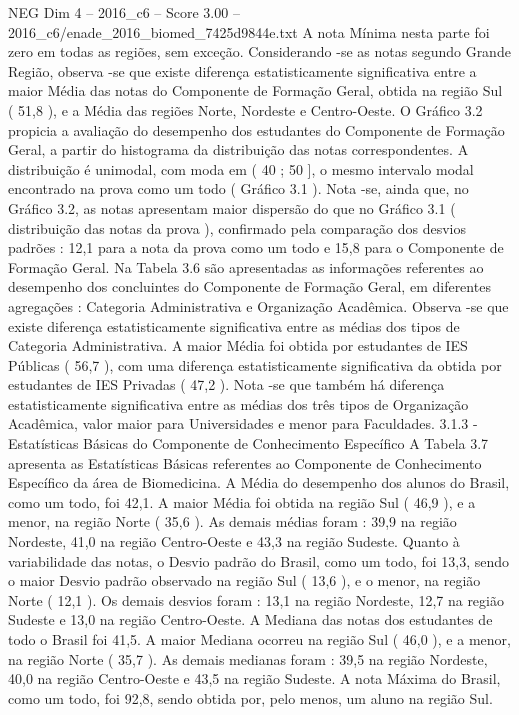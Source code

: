 \begin{textsample}{NEG Dim 4 – 2016\_c6 – Score 3.00 – 2016\_c6/enade\_2016\_biomed\_7425d9844e.txt}
A nota Mínima nesta parte foi zero em todas as regiões, sem exceção.
Considerando -se as notas segundo Grande Região, observa -se que existe diferença estatisticamente significativa entre a maior Média das notas do Componente de Formação Geral, obtida na região Sul ( 51,8 ), e a Média das regiões Norte, Nordeste e Centro-Oeste.
O Gráfico 3.2 propicia a avaliação do desempenho dos estudantes do Componente de Formação Geral, a partir do histograma da distribuição das notas correspondentes.
A distribuição é unimodal, com moda em ( 40 ; 50 ], o mesmo intervalo modal encontrado na prova como um todo ( Gráfico 3.1 ).
Nota -se, ainda que, no Gráfico 3.2, as notas apresentam maior dispersão do que no Gráfico 3.1 ( distribuição das notas da prova ), confirmado pela comparação dos desvios padrões : 12,1 para a nota da prova como um todo e 15,8 para o Componente de Formação Geral.
Na Tabela 3.6 são apresentadas as informações referentes ao desempenho dos concluintes do Componente de Formação Geral, em diferentes agregações : Categoria Administrativa e Organização Acadêmica.
Observa -se que existe diferença estatisticamente significativa entre as médias dos tipos de Categoria Administrativa.
A maior Média foi obtida por estudantes de IES Públicas ( 56,7 ), com uma diferença estatisticamente significativa da obtida por estudantes de IES Privadas ( 47,2 ).
Nota -se que também há diferença estatisticamente significativa entre as médias dos três tipos de Organização Acadêmica, valor maior para Universidades e menor para Faculdades. 3.1.3 - Estatísticas Básicas do Componente de Conhecimento Específico A Tabela 3.7 apresenta as Estatísticas Básicas referentes ao Componente de Conhecimento Específico da área de Biomedicina.
A Média do desempenho dos alunos do Brasil, como um todo, foi 42,1.
A maior Média foi obtida na região Sul ( 46,9 ), e a menor, na região Norte ( 35,6 ).
As demais médias foram : 39,9 na região Nordeste, 41,0 na região Centro-Oeste e 43,3 na região Sudeste.
Quanto à variabilidade das notas, o Desvio padrão do Brasil, como um todo, foi 13,3, sendo o maior Desvio padrão observado na região Sul ( 13,6 ), e o menor, na região Norte ( 12,1 ).
Os demais desvios foram : 13,1 na região Nordeste, 12,7 na região Sudeste e 13,0 na região Centro-Oeste.
A Mediana das notas dos estudantes de todo o Brasil foi 41,5.
A maior Mediana ocorreu na região Sul ( 46,0 ), e a menor, na região Norte ( 35,7 ).
As demais medianas foram : 39,5 na região Nordeste, 40,0 na região Centro-Oeste e 43,5 na região Sudeste.
A nota Máxima do Brasil, como um todo, foi 92,8, sendo obtida por, pelo menos, um aluno na região Sul.

\end{textsample}
